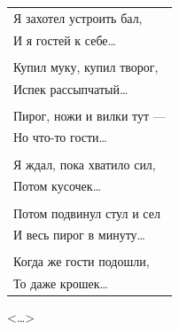 \begin{center}
\begin{tabular}{l}
Я захотел устроить бал, \\
И я гостей к себе\dots{} \\
\\[2mm]
Купил муку, купил творог, \\
Испек рассыпчатый\dots{} \\
\\[2mm]
Пирог, ножи и вилки тут --- \\
Но что-то гости\dots{} \\
\\[2mm]
Я ждал, пока хватило сил, \\
Потом кусочек\dots{} \\
\\[2mm]
Потом подвинул стул и сел \\
И весь пирог в минуту\dots{} \\
\\[2mm]
Когда же гости подошли, \\
То даже крошек\dots{}
\end{tabular}
\end{center}
\begin{flushright} <\dots> \end{flushright}